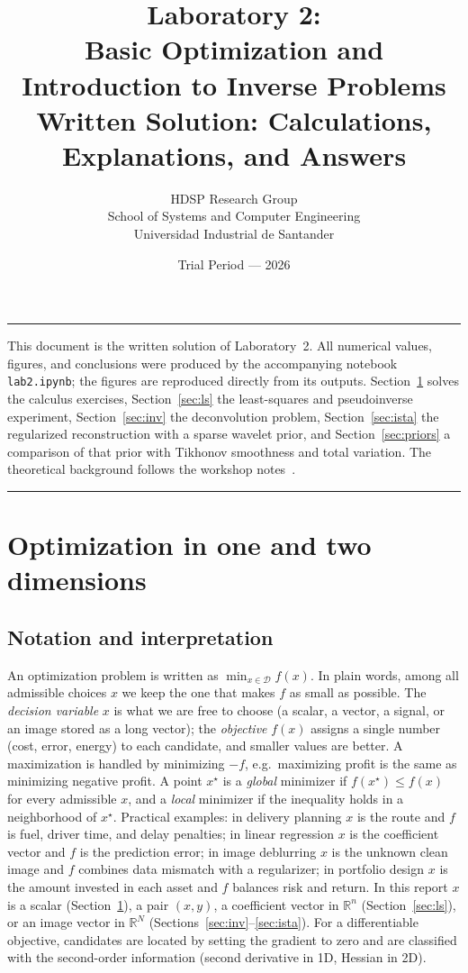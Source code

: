 \documentclass[11pt,a4paper]{article}
\title{\vspace{-1.4cm}
\textbf{Laboratory 2:}\\[2pt]
\textbf{Basic Optimization and\\[2pt] Introduction to Inverse Problems}\\[6pt]
\large Written Solution: Calculations, Explanations, and Answers}
\author{HDSP Research Group\\
School of Systems and Computer Engineering\\
Universidad Industrial de Santander}
\date{Trial Period --- 2026}
\newcommand{\R}{\mathbb{R}}
\begin{document}
\maketitle

\vspace{-0.5cm}
\noindent\rule{\textwidth}{0.4pt}\par
\small
This document is the written solution of Laboratory~2. All numerical values, figures, and
conclusions were produced by the accompanying notebook \texttt{lab2.ipynb}; the figures are
reproduced directly from its outputs. Section~\ref{sec:opt} solves the calculus exercises,
Section~\ref{sec:ls} the least-squares and pseudoinverse experiment, Section~\ref{sec:inv} the
deconvolution problem, Section~\ref{sec:ista} the regularized reconstruction with a sparse
wavelet prior, and Section~\ref{sec:priors} a comparison of that prior with Tikhonov smoothness
and total variation. The theoretical background follows the workshop notes~\cite{heckel2024}.

\normalsize
\noindent\rule{\textwidth}{0.4pt}\par

\section{Optimization in one and two dimensions}\label{sec:opt}

\subsection{Notation and interpretation}

An optimization problem is written as $\min_{x\in\mathcal{D}} f(x)$. In plain words, among all
admissible choices $x$ we keep the one that makes $f$ as small as possible. The \emph{decision
variable} $x$ is what we are free to choose (a scalar, a vector, a signal, or an image stored as a
long vector); the \emph{objective} $f(x)$ assigns a single number (cost, error, energy) to each
candidate, and smaller values are better. A maximization is handled by minimizing $-f$, e.g.\
maximizing profit is the same as minimizing negative profit. A point $x^\star$ is a
\emph{global} minimizer if $f(x^\star)\le f(x)$ for every admissible $x$, and a \emph{local}
minimizer if the inequality holds in a neighborhood of $x^\star$. Practical examples: in delivery
planning $x$ is the route and $f$ is fuel, driver time, and delay penalties; in linear regression
$x$ is the coefficient vector and $f$ is the prediction error; in image deblurring $x$ is the
unknown clean image and $f$ combines data mismatch with a regularizer; in portfolio design $x$ is
the amount invested in each asset and $f$ balances risk and return. In this report $x$ is a scalar
(Section~\ref{sec:opt}), a pair $(x,y)$, a coefficient vector in $\R^n$ (Section~\ref{sec:ls}), or
an image vector in $\R^N$ (Sections~\ref{sec:inv}--\ref{sec:ista}). For a differentiable
objective, candidates are located by setting the gradient to zero and are classified with the
second-order information (second derivative in 1D, Hessian in 2D).
\end{document}
